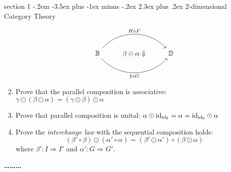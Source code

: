 \documentclass[12pt]{article}
\makeatletter
\newenvironment{problem}{\@startsection
       {section}
       {1}
       {-.2em}
       {-3.5ex plus -1ex minus -.2ex}
       {2.3ex plus .2ex}
       {\pagebreak[3]%
       \large\bf\noindent{Problem }
       }
       }
       {%
       \begin{center}\large\bf \ldots\ldots\ldots\end{center}}
\makeatother
\begin{document}
\begin{problem}{2-dimensional Category Theory}
\begin{enumerate}
  \[ %
\begin{tikzcd}
\mathbb B \arrow[rr, "H \circ F", bend left=49] \arrow[rr, "I \circ G"', bend right=49] & \beta \odot \alpha \Downarrow & \mathbb D
\end{tikzcd} \]
\item Prove that the parallel composition is associative: $\gamma
  \odot (\beta \odot \alpha) = (\gamma \odot \beta)\odot \alpha$
\item Prove that parallel composition is unital: $\alpha \odot \textrm{id}_{\textrm{id}_{\mathbb B}} = \alpha = \textrm{id}_{\textrm{id}_{\mathbb B}} \odot \alpha$
\item Prove the \emph{interchange law} with the sequential composition
  holds: \[(\beta' \circ \beta) \odot (\alpha' \circ \alpha) = (\beta'
  \odot \alpha') \circ (\beta \odot \alpha)\] where $\beta' : I
  \Rightarrow I'$ and $\alpha' : G \Rightarrow G'$.
\end{enumerate}
\end{problem}
\end{document}
